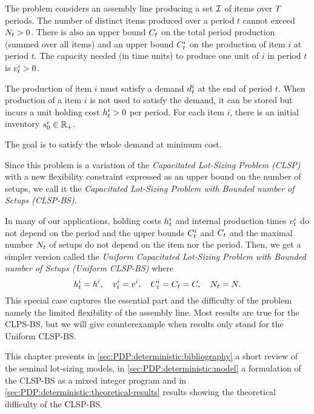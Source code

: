 \medskip

The problem considers an assembly line producing a set $\mathcal{I}$ of items over $T$ periods. The number of distinct items produced over a period $t$ cannot exceed $N_t>0$. There is also an upper bound $C_t$ on the total period production (summed over all items) and an upper bound $C_t^i$ on the production of item $i$ at period $t$. The capacity needed (in time units) to produce one unit of $i$ in period $t$ is $v_t^i>0$.

The production of item $i$ must satisfy a demand $d_t^i$ at the end of period $t$. When production of a item $i$ is not used to satisfy the demand, it can be stored but incurs a unit holding cost $h_t^i>0$ per period. For each item $i$, there is an initial inventory $s_0^i\in\mathbb{R}_+$.

The goal is to satisfy the whole demand at minimum cost.

Since this problem is a variation of the \emph{Capacitated Lot-Sizing Problem (CLSP)} with a new flexibility constraint expressed as an upper bound on the number of setups, we call it the \emph{Capacitated Lot-Sizing Problem with Bounded number of Setups (CLSP-BS)}.

In many of our applications, holding costs $h_t^i$ and internal production times $v_t^i$ do not depend on the period and the upper bounds $C_t^i$ and $C_t$ and the maximal number $N_t$ of setups do not depend on the item nor the period. Then, we get a simpler version called the \emph{Uniform Capacitated Lot-Sizing Problem with Bounded number of Setups (Uniform CLSP-BS)} where
\begin{equation}
  h_t^i=h^i,\quad
  v_t^i=v^i,\quad
  C_t^i=C_t=C,\quad
  N_t=N.
\end{equation}
This special case captures the essential part and the difficulty of the problem namely the limited flexibility of the assembly line. Most results are true for the CLPS-BS, but we will give counterexample when results only stand for the Uniform CLSP-BS.


\medskip

This chapter presents in \cref{sec:PDP:deterministic:bibliography} a short review of the seminal lot-sizing models, in \cref{sec:PDP:deterministic:model} a formulation of the CLSP-BS as a mixed integer program and in \cref{sec:PDP:deterministic:theoretical-results} results showing the theoretical difficulty of the CLSP-BS.



